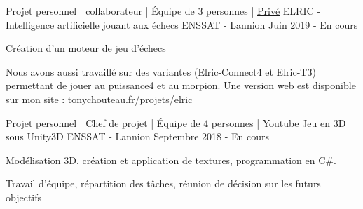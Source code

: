 

\begin{cventries}

  \cventry
    {Projet personnel | collaborateur | Équipe de 3 personnes | \href{}{\faGithubSquare\acvHeaderIconSep Privé}} %
    {ELRIC - Intelligence artificielle jouant aux échecs} %
    {ENSSAT - Lannion} %
    {Juin 2019 - En cours} %
    {
      \begin{cvitems} %
        \item {Création d'un moteur de jeu d'échecs}
        \item {Nous avons aussi travaillé sur des variantes (Elric-Connect4 et Elric-T3) permettant de jouer au puissance4 et au morpion. Une version web est disponible sur mon site : \href{https://www.tonychouteau.fr/projets/elric}{tonychouteau.fr/projets/elric}}
      \end{cvitems}
    }

  \cventry
    {Projet personnel | Chef de projet | Équipe de 4 personnes | \href{https://www.youtube.com/watch?v=UOTBFmHr2dg}{\faYoutubeSquare\acvHeaderIconSep Youtube}} %
    {Jeu en 3D sous Unity3D} %
    {ENSSAT - Lannion} %
    {Septembre 2018 - En cours} %
    {
      \begin{cvitems} %
        \item {Modélisation 3D, création et application de textures, programmation en C\#.}
        \item {Travail d'équipe, répartition des tâches, réunion de décision sur les futurs objectifs}
      \end{cvitems}
    }


\end{cventries}

